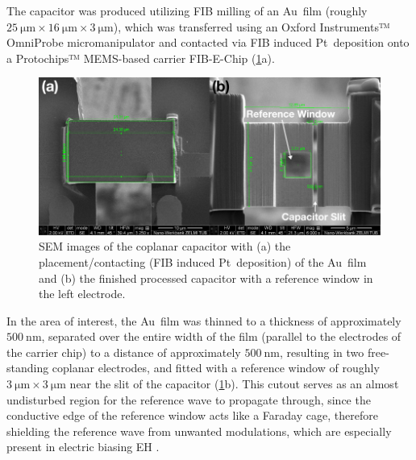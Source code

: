 The capacitor was produced utilizing FIB milling of an Au~film (roughly $\SI{25}{\um} \times \SI{16}{\um} \times \SI{3}{\um}$), which was transferred using an Oxford Instruments™ OmniProbe micromanipulator and contacted via FIB induced Pt~deposition onto a Protochips™ MEMS-based carrier FIB-E-Chip (\cref{fig:capacitor-specimen-FIB-preperation-SEM}a).
\begin{figure}[H]
	\centering
	\includegraphics[width=\textwidth]{Figures/Specimen/Capacitor/capacitor-specimen-FIB-preperation-SEM.pdf}
	\caption{SEM images of the coplanar capacitor with (a) the placement/contacting (FIB induced Pt~deposition) of the Au~film and (b) the finished processed capacitor with a reference window in the left electrode.}
	\label{fig:capacitor-specimen-FIB-preperation-SEM}
\end{figure}
In the area of interest, the Au~film was thinned to a thickness of approximately $\SI{500}{\nm}$, separated over the entire width of the film (parallel to the electrodes of the carrier chip) to a distance of approximately $\SI{500}{\nm}$, resulting in two free-standing coplanar electrodes, and fitted with a reference window of roughly $\SI{3}{\um} \times \SI{3}{\um}$ near the slit of the capacitor (\cref{fig:capacitor-specimen-FIB-preperation-SEM}b). This cutout serves as an almost undisturbed region for the reference wave to propagate through, since the conductive edge of the reference window acts like a Faraday cage, therefore shielding the reference wave from unwanted modulations, which are especially present in electric biasing EH \cite{Wagner2019,Wagner2022}.
\newpage
